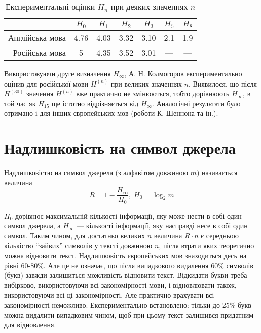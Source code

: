 \begin{table}[h!]
    \begin{center}
        \begin{tabular}{|r|c|c|c|c|c|c|}
            \hline
            & $H_0$ & $H_1$ & $H_2$ & $H_3$ & $H_5$ & $H_8$ \\
            \hline
            Англійська мова & 4.76 & 4.03 & 3.32 & 3.10 & 2.1 & 1.9 \\
            \hline
            Російська мова & 5 & 4.35 & 3.52 & 3.01 & --- & --- \\
            \hline
        \end{tabular}
      \end{center}
    \caption{Експериментальні оцінки $H_n$ при деяких значеннях $n$}
    \label{table:experimentalEntropy}
\end{table}

Використовуючи друге визначення  $H_\infty$, А. Н. Колмогоров
експериментально оцінив для російської мови  $H^{(n)}$ при великих
значеннях $n$. Виявилося, що після  $H^{\left( 30 \right)}$ значення 
$H^{\left( n \right)}$ вже практично не змінюються, тобто дорівнюють
$H_\infty$, в той час як  $H_{15}$ ще істотно відрізняється від  $H_\infty$.
Аналогічні результати було отримано  і для інших європейських мов (роботи
К. Шеннона та ін.).

\section{Надлишковість на символ джерела}
\begin{definition}
    Надлишковістю на символ джерела (з алфавітом довжиною $m$)
    називається величина
    $$R = 1 - \frac{H_\infty}{H_0},\; H_0=\log_2{m}$$
\end{definition}

$H_0$ дорівнює максимальній кількості інформації, яку може нести в собі
один символ джерела, а  $H_\infty$ --- кількості інформації, яку насправді
несе в собі один символ. Таким чином, для достатньо великих  $n$ величина 
$R\cdot n$ є середньою кількістю “зайвих” символів у тексті довжиною  $n$,
після втрати яких теоретично можна відновити текст. Надлишковість європейських
мов знаходиться десь на рівні 60-80\%. Але це не означає, що після випадкового
видалення 60\% символів (букв) завжди залишиться можливість відновити текст.
Відкидати букви треба вибірково, використовуючи всі закономірності мови, і
відновлювати також, використовуючи всі ці закономірності. Але практично
врахувати всі закономірності неможливо. Експериментально встановлено: тільки до
25\% букв можна видалити випадковим чином, щоб при цьому текст залишився
придатним для відновлення.


